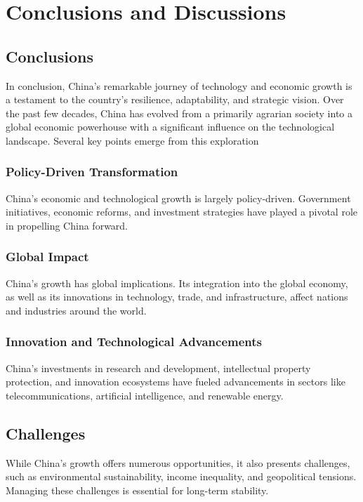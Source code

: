 \chapter{Conclusions and Discussions}

\section{Conclusions}

In conclusion, China's remarkable journey of technology and economic growth 
is a testament to the country's resilience, adaptability, and strategic vision. 
Over the past few decades, China has evolved from a primarily agrarian society 
into a global economic powerhouse with a significant influence on the 
technological landscape. Several key points emerge from this exploration

\subsection{Policy-Driven Transformation}

China's economic and technological growth is largely policy-driven. Government 
initiatives, economic reforms, and investment strategies have played a pivotal 
role in propelling China forward.

\subsection{Global Impact}

China's growth has global implications. Its integration into the global economy, 
as well as its innovations in technology, trade, and infrastructure, affect 
nations and industries around the world.

\subsection{Innovation and Technological Advancements}

China's investments in research and development, intellectual property protection, 
and innovation ecosystems have fueled advancements in sectors like 
telecommunications, artificial intelligence, and renewable energy.

\section{Challenges}

While China's growth offers numerous opportunities, it also presents challenges, such 
as environmental sustainability, income inequality, and geopolitical tensions. 
Managing these challenges is essential for long-term stability.

